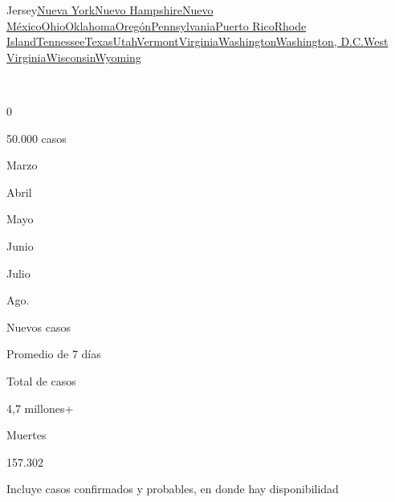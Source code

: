 {Jersey}\href{https://www.nytimes.com/interactive/2020/us/new-york-coronavirus-cases.html}{Nueva
York}\href{https://www.nytimes.com/interactive/2020/us/new-hampshire-coronavirus-cases.html}{Nuevo
Hampshire}\href{https://www.nytimes.com/interactive/2020/us/new-mexico-coronavirus-cases.html}{Nuevo
México}\href{https://www.nytimes.com/interactive/2020/us/ohio-coronavirus-cases.html}{Ohio}\href{https://www.nytimes.com/interactive/2020/us/oklahoma-coronavirus-cases.html}{Oklahoma}\href{https://www.nytimes.com/interactive/2020/us/oregon-coronavirus-cases.html}{Oregón}\href{https://www.nytimes.com/interactive/2020/us/pennsylvania-coronavirus-cases.html}{Pennsylvania}\href{https://www.nytimes.com/interactive/2020/us/puerto-rico-coronavirus-cases.html}{Puerto
Rico}\href{https://www.nytimes.com/interactive/2020/us/rhode-island-coronavirus-cases.html}{Rhode
Island}\href{https://www.nytimes.com/interactive/2020/us/tennessee-coronavirus-cases.html}{Tennessee}\href{https://www.nytimes.com/interactive/2020/us/texas-coronavirus-cases.html}{Texas}\href{https://www.nytimes.com/interactive/2020/us/utah-coronavirus-cases.html}{Utah}\href{https://www.nytimes.com/interactive/2020/us/vermont-coronavirus-cases.html}{Vermont}\href{https://www.nytimes.com/interactive/2020/us/virginia-coronavirus-cases.html}{Virginia}\href{https://www.nytimes.com/interactive/2020/us/washington-coronavirus-cases.html}{Washington}\href{https://www.nytimes.com/interactive/2020/us/washington-dc-coronavirus-cases.html}{Washington,
D.C.}\href{https://www.nytimes.com/interactive/2020/us/west-virginia-coronavirus-cases.html}{West
Virginia}\href{https://www.nytimes.com/interactive/2020/us/wisconsin-coronavirus-cases.html}{Wisconsin}\href{https://www.nytimes.com/interactive/2020/us/wyoming-coronavirus-cases.html}{Wyoming}

~

0

50.000 casos

Marzo

Abril

Mayo

Junio

Julio

Ago.

Nuevos casos

Promedio de 7 días

Total de casos

4,7 millones+

Muertes

157.302

Incluye casos confirmados y probables, en donde hay disponibilidad

